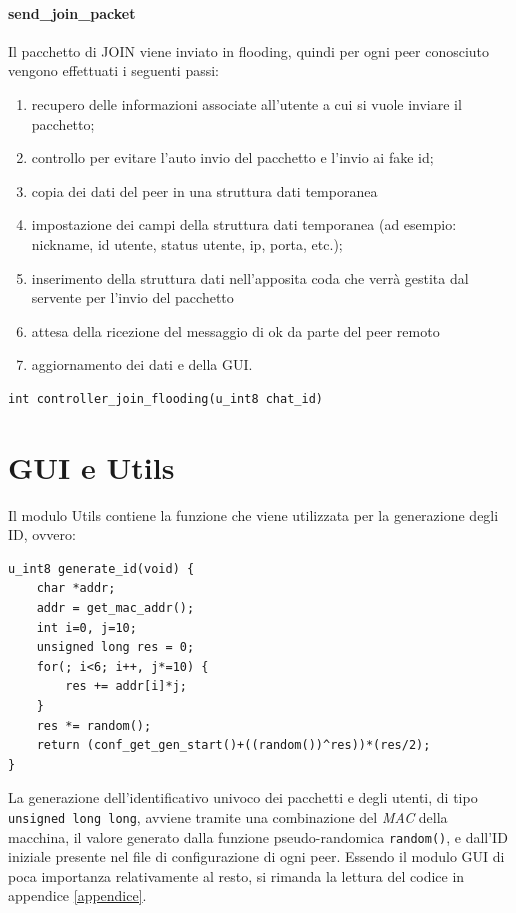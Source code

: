 \paragraph{send\_join\_packet}
Il pacchetto di JOIN viene inviato in flooding, quindi per ogni peer conosciuto vengono effettuati i seguenti passi:
\begin{enumerate}
\item recupero delle informazioni associate all'utente a cui si vuole inviare il pacchetto;
\item controllo per evitare l'auto invio del pacchetto e l'invio ai fake id;
\item copia dei dati del peer in una struttura dati temporanea
\item impostazione dei campi della struttura dati temporanea (ad esempio: nickname, id utente, status utente, ip, porta, etc.);
\item inserimento della struttura dati nell'apposita coda che verrà gestita dal servente per l'invio del pacchetto
\item attesa della ricezione del messaggio di ok da parte del peer remoto
\item aggiornamento dei dati e della GUI.
\end{enumerate}
\begin{lstlisting}
int controller_join_flooding(u_int8 chat_id)
\end{lstlisting}
\section{GUI e Utils}
Il modulo Utils contiene la funzione che viene utilizzata per la generazione degli ID, ovvero:
\begin{lstlisting}
u_int8 generate_id(void) {
	char *addr;
	addr = get_mac_addr();
	int i=0, j=10;
	unsigned long res = 0;
	for(; i<6; i++, j*=10) {
		res += addr[i]*j;
	}
	res *= random();
	return (conf_get_gen_start()+((random())^res))*(res/2);
}
\end{lstlisting}
La generazione dell'identificativo univoco dei pacchetti e degli utenti, di tipo \texttt{unsigned long long}, avviene tramite una combinazione del \textit{MAC} della macchina, il valore generato dalla funzione pseudo-randomica \texttt{random()}, e dall'ID iniziale presente nel file di configurazione di ogni peer.
Essendo il modulo GUI di poca importanza relativamente al resto, si rimanda la lettura del codice in appendice \ref{appendice}.